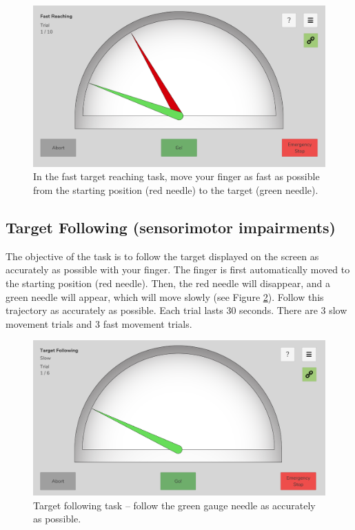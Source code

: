 \documentclass[10pt,oneside,a4paper]{article}
\begin{document}
\begin{figure}[h!]
\begin{center}
\includegraphics[width=0.7\columnwidth]{images/Assessments/FastReaching.png}
\caption{In the fast target reaching task, move your finger as fast as possible from the starting position (red needle) to the target (green needle).}
\label{fig:FastReaching}
\end{center}
\end{figure}

\subsection{Target Following (sensorimotor impairments)}
The objective of the task is to follow the target displayed on the screen as accurately as possible with your finger. The finger is first automatically moved to the starting position (red needle). Then, the red needle will disappear, and a green needle will appear, which will move slowly (see Figure \ref{fig:TargetFollowing}). Follow this trajectory as accurately as possible. Each trial lasts 30 seconds. There are 3 slow movement trials and 3 fast movement trials. 

\begin{figure}[h!]
\begin{center}
\includegraphics[width=0.7\columnwidth]{images/Assessments/TargetFollowing.png}
\caption{Target following task – follow the green gauge needle as accurately as possible.}
\label{fig:TargetFollowing}
\end{center}
\end{figure}
\end{document}
